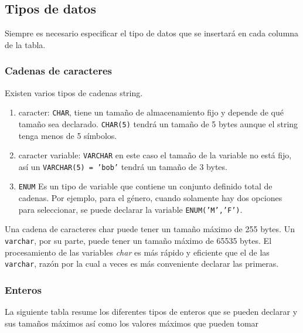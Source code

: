     \subsection{Tipos de datos}
    Siempre es necesario especificar el tipo de datos que se insertará en cada columna de la tabla.
    \subsubsection{Cadenas de caracteres}

    Existen varios tipos de cadenas string. 

    \begin{enumerate}
        \item caracter: \texttt{CHAR}, tiene un tamaño de almacenamiento fijo y depende de qué tamaño sea declarado. \texttt{CHAR(5)} tendrá un tamaño de 5 bytes aunque el string tenga menos de 5 símbolos. 
        \item caracter variable: \texttt{VARCHAR} en este caso el tamaño de la variable no está fijo, así un \texttt{VARCHAR(5) = 'bob'} tendrá un tamaño de 3 bytes.
        \item \texttt{ENUM} Es un tipo de variable que contiene un conjunto definido total de cadenas. Por ejemplo, para el género, cuando solamente hay dos opciones para seleccionar, se puede declarar la variable \texttt{ENUM('M','F')}.
    \end{enumerate}

    Una cadena de caracteres char puede tener un tamaño máximo de 255 bytes. Un \texttt{varchar}, por su parte, puede tener un tamaño máximo de 65535 bytes. El procesamiento de las variables \textit{char} es más rápido y eficiente que el de las \texttt{varchar}, razón por la cual a veces es más conveniente declarar las primeras. \\ 

    \subsubsection{Enteros}

    La siguiente tabla resume los diferentes tipos de enteros que se pueden declarar y sus tamaños máximos así como los valores máximos que pueden tomar

